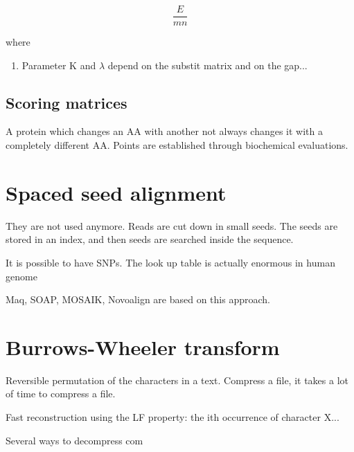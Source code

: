 \begin{equation}
\frac{E}{mn}
\end{equation}

where
\begin{enumerate}
\item Parameter K and $\lambda$ depend on the substit matrix and on the gap...
\end{enumerate}

\subsection{Scoring matrices}
A protein which changes an AA with another not always changes it with a completely different AA. Points are established through biochemical evaluations.


\section{Spaced seed alignment}
They are not used anymore. Reads are cut down in small seeds. The seeds are stored in an index, and then seeds are searched inside the sequence.

It is possible to have SNPs.
The look up table is actually enormous in human genome


Maq, SOAP, MOSAIK, Novoalign are based on this approach.


\section{Burrows-Wheeler transform}
Reversible permutation of the characters in a text. Compress a file, it takes a lot of time to compress a file.

Fast reconstruction using the LF  property: the ith occurrence of character X...

Several ways  to decompress com
